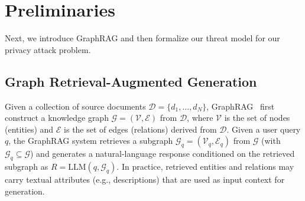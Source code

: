 \section{Preliminaries}



Next, we introduce GraphRAG and then formalize our threat model for our privacy attack problem.

\subsection{Graph Retrieval-Augmented Generation}

Given a collection of source documents $\mathcal{D}=\{d_1,\ldots,d_N\}$, GraphRAG~\cite{edge2024local,guo2024lightrag,jimenez2024hipporag} first construct a knowledge graph $\mathcal{G}=(\mathcal{V},\mathcal{E})$ from $\mathcal{D}$, where $\mathcal{V}$ is the set of nodes (entities) and $\mathcal{E}$ is the set of edges (relations) derived from $\mathcal{D}$. 
Given a user query $q$, the GraphRAG system retrieves a subgraph $\mathcal{G}_q=(\mathcal{V}_q,\mathcal{E}_q)$ from $\mathcal{G}$ (with $\mathcal{G}_q \subseteq \mathcal{G}$) and generates a natural-language response conditioned on the retrieved subgraph as $R = \mathrm{LLM}(q, \mathcal{G}_q)$. 
In practice, retrieved entities and relations may carry textual attributes (e.g., descriptions) that are used as input context for generation.



